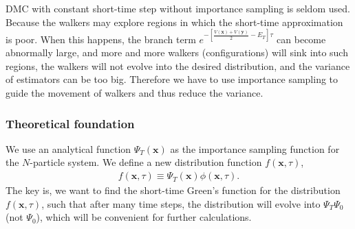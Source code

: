 \documentclass[12pt,letterpaper,UTF8]{report}
\begin{document}
{DMC with constant short-time step without importance sampling is seldom used.
Because the walkers may explore regions in which the short-time approximation is poor.
When this happens, the branch term $e^{ - \left[  \frac{ V(\bm{x}) + V(\bm{y})  }{2} - E_T \right] \tau  }$ can become abnormally large, and more and more walkers (configurations) will sink into such regions, the walkers will not evolve into the desired distribution, and the variance of estimators can be too big. Therefore we have to use importance sampling to guide the movement of walkers and thus reduce the variance.

\subsubsection{ Theoretical foundation }
We use an analytical function $\Psi_T(\bm{x})$ as the importance sampling function for the $N$-particle system. We define a new distribution function $f(\bm{x},\tau)$,
\begin{eqnarray}
f(\bm{x},\tau) \equiv \Psi_T(\bm{x}) \phi(\bm{x},\tau).
 \end{eqnarray}
The key is, we want to find the short-time Green's function for the distribution $f(\bm{x},\tau)$, such that after many time steps, the distribution will evolve into $\Psi_T \Psi_0$(not $\Psi_0$), which will be convenient for further calculations.

}
\end{document}
